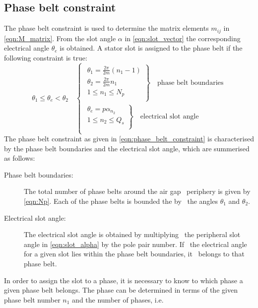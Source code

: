 \subsection{Phase belt constraint}
The phase belt constraint is used to determine the matrix elements $m_{ij}$ in \eqref{eqn:M_matrix}. From the slot angle $\alpha$ in \eqref{eqn:slot_vector} the corresponding electrical angle $\theta_e$ is obtained. A stator slot is assigned to the phase belt if the following constraint is true:
\begin{equation}	
 \label{eqn:phase_belt_constraint}
  \theta_1 \leq \theta_e  < \theta_2
  \quad
  \begin{cases}
    \left.
      \begin{array}{l}
        \theta_1 = \frac{2\pi}{2m}\left(n_1-1\right) \\
        \theta_2 = \frac{2\pi}{2m}n_1 \\
        1 \leq n_1 \leq N_p \\      
      \end{array}
    \right\} 
    \quad \mbox{phase belt boundaries} \\
    \left.
      \begin{array}{l}
        \theta_e = p\alpha_{n_2} \\
        1 \leq n_2 \leq Q_s \\      
      \end{array}    \right\} 
    \quad \mbox{electrical slot angle} \\
  \end{cases}
\end{equation} 
The phase belt constraint as given in \eqref{eqn:phase_belt_constraint} is characterised by the phase belt boundaries and the electrical slot angle, which are summerised as follows:
\begin{description}
	\item[Phase belt boundaries:] The total number of phase belts around the air gap~%
	periphery is given by \eqref{eqn:Np}. Each of the phase belts is bounded the by~%
	the angles $\theta_1$ and $\theta_2$.
	\item[Electrical slot angle:] The electrical slot angle is obtained by multiplying~%
	the peripheral slot angle in \eqref{eqn:slot_alpha} by the pole pair number. If~%
	the electrical angle for a given slot lies within the phase belt boundaries, it~%
	belongs to that phase belt.   
\end{description}
In order to assign the slot to a phase, it is necessary to know to which phase a given phase belt belongs. The phase can be determined in terms of the given phase belt number $n_1$ and the number of phases, i.e.
